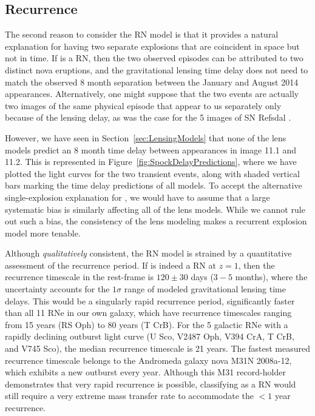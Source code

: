 \subsection{Recurrence}

The second reason to consider the RN model is that it provides a
natural explanation for having two separate explosions that are
coincident in space but not in time.  If \spock is a RN, then the two
observed episodes can be attributed to two distinct nova eruptions,
and the gravitational lensing time delay does not need to match the
observed 8 month separation between the January and August 2014
appearances.  Alternatively, one might suppose that the two \spock
events are actually two images of the same physical episode that
appear to us separately only because of the lensing delay, as was the
case for the 5 images of SN Refsdal \citep{Kelly:2015a,Kelly:2016}.

However, we have seen in Section~\ref{sec:LensingModels} that none of
the  lens models predict an 8 month time delay between
appearances in image 11.1 and 11.2.  This is represented in
Figure~\ref{fig:SpockDelayPredictions}, where we have plotted the
light curves for the two transient events, along with shaded vertical
bars marking the time delay predictions of all models.
To accept the alternative single-explosion explanation
for \spock, we would have to assume that a large systematic bias is
similarly affecting all of the lens models.  While we cannot rule out
such a bias, the consistency of the lens modeling makes a recurrent
explosion model more tenable.

Although {\it qualitatively} consistent, the RN model is strained by a
quantitative assessment of the recurrence period. If \spock is indeed
a RN at $z=1$, then the recurrence timescale in the rest-frame is
$120\pm30$ days ($3-5$ months), where the uncertainty accounts for the
$1\sigma$ range of modeled gravitational lensing time delays.  This
would be a singularly rapid recurrence period, significantly faster
than all 11 RNe in our own galaxy, which have recurrence timescales
ranging from 15 years (RS Oph) to 80 years (T CrB). For the 5 galactic
RNe with a rapidly declining outburst light curve (U Sco, V2487 Oph,
V394 CrA, T CrB, and V745 Sco), the median recurrence timescale is 21
years.  The fastest measured recurrence timescale belongs to the
Andromeda galaxy nova M31N 2008a-12, which exhibits a new outburst
every year. Although this M31 record-holder demonstrates that very
rapid recurrence is possible, classifying \spock as a RN would still
require a very extreme mass transfer rate to accommodate the $<1$ year
recurrence.

